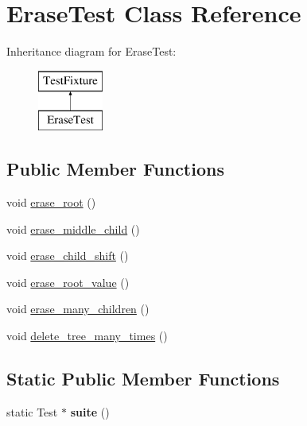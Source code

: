 \hypertarget{class_erase_test}{}\section{Erase\+Test Class Reference}
\label{class_erase_test}
Inheritance diagram for Erase\+Test\+:\begin{figure}[H]
\begin{center}
\leavevmode
\includegraphics[height=2.000000cm]{class_erase_test}
\end{center}
\end{figure}
\subsection*{Public Member Functions}
\begin{DoxyCompactItemize}
\item 
void \hyperlink{class_erase_test_aa245715a2bbbcf0bd6abcca1a0992055}{erase\+\_\+root} ()
\item 
void \hyperlink{class_erase_test_ae6bc0aa4ecaa1f2966a0e4f971d229d1}{erase\+\_\+middle\+\_\+child} ()
\item 
void \hyperlink{class_erase_test_a0897542be38d32150b6c080449bf0b2d}{erase\+\_\+child\+\_\+shift} ()
\item 
void \hyperlink{class_erase_test_a3b1971101ff3dc813242f02a0cff68bf}{erase\+\_\+root\+\_\+value} ()
\item 
void \hyperlink{class_erase_test_a7c3b732833940974b289fd52f1190306}{erase\+\_\+many\+\_\+children} ()
\item 
void \hyperlink{class_erase_test_ac80cbc1c11f5ca0f218f0632b5b368b5}{delete\+\_\+tree\+\_\+many\+\_\+times} ()
\end{DoxyCompactItemize}
\subsection*{Static Public Member Functions}
\begin{DoxyCompactItemize}
\item 
\mbox{\label{class_erase_test_ae12b35171f770e9f26decc0edc4c3206}} 
static Test $\ast$ {\bfseries suite} ()
\end{DoxyCompactItemize}


